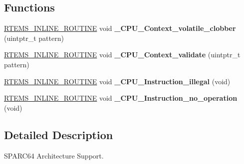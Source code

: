 \subsection*{Functions}
\begin{DoxyCompactItemize}
\item 
\mbox{\label{group__RTEMSScoreCPUSPARC64_gaeb1ddd8f84f82b13fad2a05a3e7d0ab7}} 
\mbox{\hyperlink{group__RTEMSScoreBaseDefs_gac216239df231d5dbd15e3520b0b9313f}{R\+T\+E\+M\+S\+\_\+\+I\+N\+L\+I\+N\+E\+\_\+\+R\+O\+U\+T\+I\+NE}} void {\bfseries \+\_\+\+C\+P\+U\+\_\+\+Context\+\_\+volatile\+\_\+clobber} (uintptr\+\_\+t pattern)
\item 
\mbox{\label{group__RTEMSScoreCPUSPARC64_gaae027d9a906bb67d38ebd7a9104b976b}} 
\mbox{\hyperlink{group__RTEMSScoreBaseDefs_gac216239df231d5dbd15e3520b0b9313f}{R\+T\+E\+M\+S\+\_\+\+I\+N\+L\+I\+N\+E\+\_\+\+R\+O\+U\+T\+I\+NE}} void {\bfseries \+\_\+\+C\+P\+U\+\_\+\+Context\+\_\+validate} (uintptr\+\_\+t pattern)
\item 
\mbox{\label{group__RTEMSScoreCPUSPARC64_ga07618c93359f2485af2e98a96b330208}} 
\mbox{\hyperlink{group__RTEMSScoreBaseDefs_gac216239df231d5dbd15e3520b0b9313f}{R\+T\+E\+M\+S\+\_\+\+I\+N\+L\+I\+N\+E\+\_\+\+R\+O\+U\+T\+I\+NE}} void {\bfseries \+\_\+\+C\+P\+U\+\_\+\+Instruction\+\_\+illegal} (void)
\item 
\mbox{\label{group__RTEMSScoreCPUSPARC64_gab683a0a37a089e2a0fd3c356836d5499}} 
\mbox{\hyperlink{group__RTEMSScoreBaseDefs_gac216239df231d5dbd15e3520b0b9313f}{R\+T\+E\+M\+S\+\_\+\+I\+N\+L\+I\+N\+E\+\_\+\+R\+O\+U\+T\+I\+NE}} void {\bfseries \+\_\+\+C\+P\+U\+\_\+\+Instruction\+\_\+no\+\_\+operation} (void)
\end{DoxyCompactItemize}


\subsection{Detailed Description}
S\+P\+A\+R\+C64 Architecture Support. 

